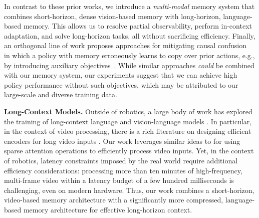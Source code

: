 In contrast to these prior works, we introduce a \emph{multi-modal} memory system that combines short-horizon, dense vision-based memory with long-horizon, language-based memory. This allows us to resolve partial observability, perform in-context adaptation, and solve long-horizon tasks, all without sacrificing efficiency. Finally, an orthogonal line of work proposes approaches for mitigating causal confusion~\citep{chi2025diffusion, zheng2024tracevla} in which a policy with memory erroneously learns to copy over prior actions, e.g., by introducing auxiliary objectives~\citep{torne2025learning}. While similar approaches \emph{could} be combined with our memory system, our experiments suggest that we can achieve high policy performance without such objectives, which may be attributed to our large-scale and diverse training data.




\noindent \textbf{Long-Context Models.} 
Outside of robotics, a large body of work has explored the training of long-context language and vision-language models \cite{liu2025comprehensive, tang2025video, ni2022expanding}. In particular, in the context of video processing, there is a rich literature on designing efficient encoders for long video inputs \cite{arnab2021vivit, bertasius2021space, li2024videomamba}. Our work leverages similar ideas to \cite{bertasius2021space, arnab2021vivit} for using sparse attention operations to efficiently process video inputs. Yet, in the context of robotics, latency constraints imposed by the real world require additional efficiency considerations: processing more than ten minutes of high-frequency, multi-frame video within a latency budget of a few hundred milliseconds is challenging, even on modern hardware. Thus, our work combines a short-horizon, video-based memory architecture with a significantly more compressed, language-based memory architecture for effective long-horizon context.
